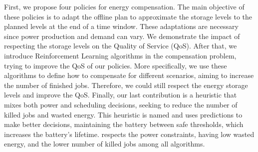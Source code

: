 First, we propose four policies for energy compensation. The main objective of these policies is to adapt the offline plan to approximate the storage levels to the planned levels at the end of a time window. These adaptations are necessary since power production and demand can vary. We demonstrate the impact of respecting the storage levels on the Quality of Service (QoS). After that, we introduce Reinforcement Learning algorithms in the compensation problem, trying to improve the QoS of our policies. More specifically, we use these algorithms to define how to compensate for different scenarios, aiming to increase the number of finished jobs. Therefore, we could still respect the energy storage levels and improve the QoS. Finally, our last contribution is a heuristic that mixes both power and scheduling decisions, seeking to reduce the number of killed jobs and wasted energy. This heuristic is named \emph{\systemName} and uses predictions to make better decisions, maintaining the battery between safe thresholds, which increases the battery's lifetime. \emph{\systemName} respects the power constraints, having low wasted energy, and the lower number of killed jobs among all algorithms.